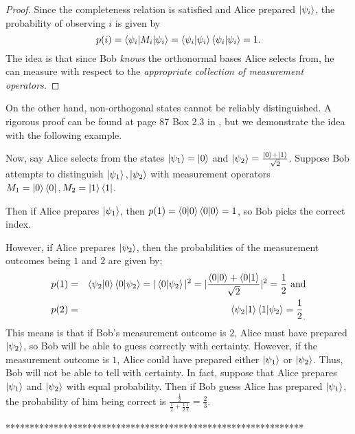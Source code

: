 {\begin{proof}
Since the completeness relation is satisfied and Alice prepared $\ket{\psi_i}$, the probability of observing $i$ is given by
\begin{equation}
p(i)=\braket{\psi_i | M_i |\psi_i}=\braket{\psi_i |\psi_i}\braket{\psi_i |\psi_i}=1.
\end{equation}
The idea is that since Bob {\emph{knows}} the orthonormal bases Alice selects from, he can measure with respect to the {\emph{appropriate collection of measurement operators.}} 
\end{proof}

On the other hand, non-orthogonal states cannot be reliably distinguished. A rigorous proof can be found at page 87 Box 2.3 in \cite{Nielsen}, but we demonstrate the idea with the following example.
\begin{example}
Now, say Alice selects from the states $\ket{\psi_1}=\ket{0}$ and  $\ket{\psi_2}=\frac{\ket{0}+\ket{1}}{\sqrt{2}}$. Suppose Bob attempts to distinguish $\ket{\psi_1}, \ket{\psi_2}$ with measurement operators $M_1=\ket{0}\bra{0}, M_2=\ket{1}\bra{1}$.

Then if Alice prepares $\ket{\psi_1}$, then $p(1)=\braket{0 |0}\braket{0|0}=1$, so Bob picks the correct index. 

However, if Alice prepares $\ket{\psi_2}$, then the probabilities of the measurement outcomes being $1$ and $2$ are given by;
\begin{eqnarray}
    p(1)&=&\braket{\psi_2|0}\braket{0|\psi_2}=|\braket{0|\psi_2}|^2=|\frac{\braket{0|0}+\braket{0|1}}{\sqrt{2}}|^2=\frac{1}{2}\textrm{ and}\\
    p(2)&=&\braket{\psi_2|1}\braket{1|\psi_2}={\frac{1}{2}}_.
\end{eqnarray}
This means is that if Bob's measurement outcome is $2$, Alice must have prepared $\ket{\psi_2}$, so Bob will be able to guess correctly with certainty. However, if the measurement outcome is $1$, Alice could have prepared either $\ket{\psi_1}$ or $\ket{\psi_2}$.  Thus, Bob will not be able to tell with certainty.  In fact, suppose that Alice prepares $\ket{\psi_1}$ and $\ket{\psi_2}$ with equal probability.  Then if Bob guess Alice has prepared $\ket{\psi_1}$, the probability of him being correct is $\frac{\frac{1}{2}}{\frac{1}{2}+\frac{1}{2}\frac{1}{2}}=\frac{2}{3}$.
\end{example}


**************************************************************
}
